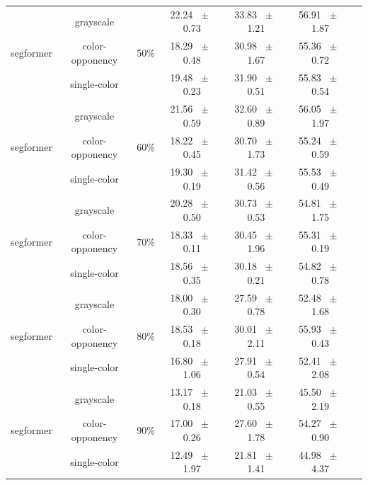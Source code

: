 \begin{table}[h]
\begin{tabular}{@{}lccc ccc@{}}
    \midrule
    \multirow{3}{*}{segformer} & grayscale & \multirow{3}{*}{50\%} & 22.24 ~$\pm$~ 0.73 & 33.83 ~$\pm$~ 1.21 & 56.91 ~$\pm$~ 1.87 \\
    & color-opponency &  & 18.29 ~$\pm$~ 0.48 & 30.98 ~$\pm$~ 1.67 & 55.36 ~$\pm$~ 0.72 \\
    & single-color &  & 19.48 ~$\pm$~ 0.23 & 31.90 ~$\pm$~ 0.51 & 55.83 ~$\pm$~ 0.54 \\
    \midrule
    \multirow{3}{*}{segformer} & grayscale & \multirow{3}{*}{60\%} & 21.56 ~$\pm$~ 0.59 & 32.60 ~$\pm$~ 0.89 & 56.05 ~$\pm$~ 1.97 \\
    & color-opponency &  & 18.22 ~$\pm$~ 0.45 & 30.70 ~$\pm$~ 1.73 & 55.24 ~$\pm$~ 0.59 \\
    & single-color &  & 19.30 ~$\pm$~ 0.19 & 31.42 ~$\pm$~ 0.56 & 55.53 ~$\pm$~ 0.49 \\
    \midrule
    \multirow{3}{*}{segformer} & grayscale & \multirow{3}{*}{70\%} & 20.28 ~$\pm$~ 0.50 & 30.73 ~$\pm$~ 0.53 & 54.81 ~$\pm$~ 1.75 \\
    & color-opponency &  & 18.33 ~$\pm$~ 0.11 & 30.45 ~$\pm$~ 1.96 & 55.31 ~$\pm$~ 0.19 \\
    & single-color &  & 18.56 ~$\pm$~ 0.35 & 30.18 ~$\pm$~ 0.21 & 54.82 ~$\pm$~ 0.78 \\
    \midrule
    \multirow{3}{*}{segformer} & grayscale & \multirow{3}{*}{80\%} & 18.00 ~$\pm$~ 0.30 & 27.59 ~$\pm$~ 0.78 & 52.48 ~$\pm$~ 1.68 \\
    & color-opponency &  & 18.53 ~$\pm$~ 0.18 & 30.01 ~$\pm$~ 2.11 & 55.93 ~$\pm$~ 0.43 \\
    & single-color &  & 16.80 ~$\pm$~ 1.06 & 27.91 ~$\pm$~ 0.54 & 52.41 ~$\pm$~ 2.08 \\
    \midrule
    \multirow{3}{*}{segformer} & grayscale & \multirow{3}{*}{90\%} & 13.17 ~$\pm$~ 0.18 & 21.03 ~$\pm$~ 0.55 & 45.50 ~$\pm$~ 2.19 \\
    & color-opponency &  & 17.00 ~$\pm$~ 0.26 & 27.60 ~$\pm$~ 1.78 & 54.27 ~$\pm$~ 0.90 \\
    & single-color &  & 12.49 ~$\pm$~ 1.97 & 21.81 ~$\pm$~ 1.41 & 44.98 ~$\pm$~ 4.37 \\
    \midrule
    \bottomrule
  \end{tabular}
  \label{tab:sparse_results_segformer_acdc_night}
\end{table}